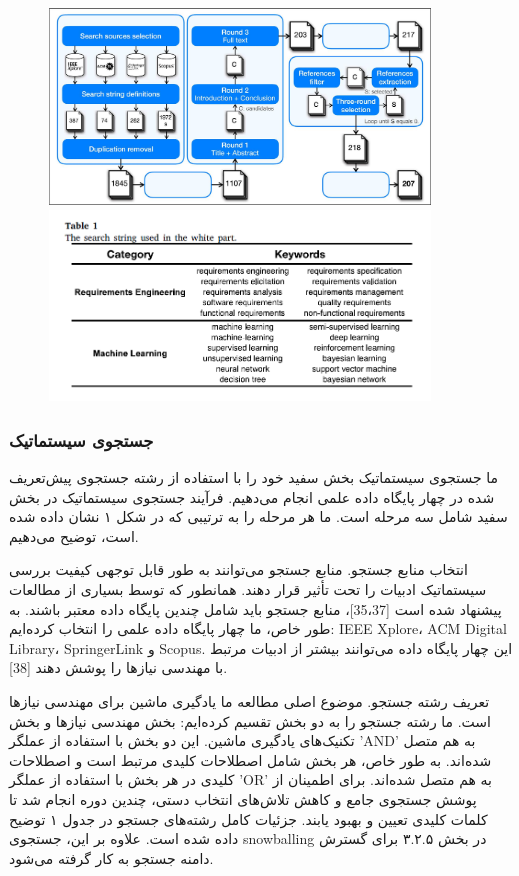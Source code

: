 \documentclass[a4paper,10pt]{article}
\begin{document}
            \begin{figure}
                \centering
                \includegraphics[width=0.9\textwidth]{Image/fig-1.jpg}
                \includegraphics[width=0.9\textwidth]{Image/table-1.png}
            \end{figure}

            \subsubsection{جستجوی سیستماتیک}

                ما جستجوی سیستماتیک بخش سفید خود را با استفاده از رشته جستجوی پیش‌تعریف شده در چهار پایگاه داده علمی انجام می‌دهیم. فرآیند جستجوی سیستماتیک در بخش سفید شامل سه مرحله است. ما هر مرحله را به ترتیبی که در شکل ۱ نشان داده شده است، توضیح می‌دهیم.

                انتخاب منابع جستجو. منابع جستجو می‌توانند به طور قابل توجهی کیفیت بررسی سیستماتیک ادبیات را تحت تأثیر قرار دهند. همانطور که توسط بسیاری از مطالعات پیشنهاد شده است [35،37]، منابع جستجو باید شامل چندین پایگاه داده معتبر باشند. به طور خاص، ما چهار پایگاه داده علمی را انتخاب کرده‌ایم: IEEE Xplore، ACM Digital Library، SpringerLink و Scopus. این چهار پایگاه داده می‌توانند بیشتر از ادبیات مرتبط با مهندسی نیازها را پوشش دهند [38].

                تعریف رشته جستجو. موضوع اصلی مطالعه ما یادگیری ماشین برای مهندسی نیازها است. ما رشته جستجو را به دو بخش تقسیم کرده‌ایم: بخش مهندسی نیازها و بخش تکنیک‌های یادگیری ماشین. این دو بخش با استفاده از عملگر 'AND' به هم متصل شده‌اند. به طور خاص، هر بخش شامل اصطلاحات کلیدی مرتبط است و اصطلاحات کلیدی در هر بخش با استفاده از عملگر 'OR' به هم متصل شده‌اند. برای اطمینان از پوشش جستجوی جامع و کاهش تلاش‌های انتخاب دستی، چندین دوره انجام شد تا کلمات کلیدی تعیین و بهبود یابند. جزئیات کامل رشته‌های جستجو در جدول ۱ توضیح داده شده است. علاوه بر این، جستجوی snowballing در بخش ۳.۲.۵ برای گسترش دامنه جستجو به کار گرفته می‌شود.
\end{document}
